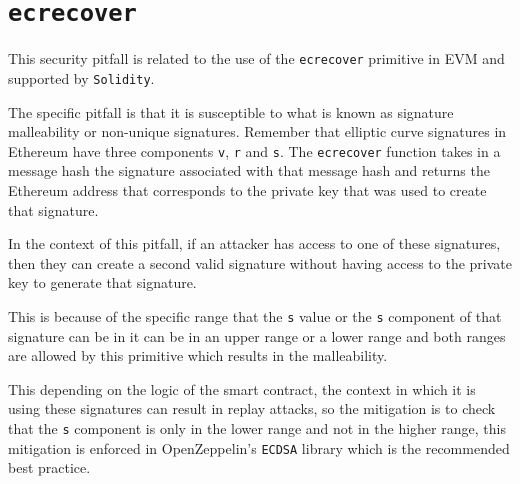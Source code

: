 \section{\texorpdfstring{\texttt{ecrecover}}{ecrecover}}\label{ecrecover}

This security pitfall is related to the use of the \texttt{ecrecover}
primitive in EVM and supported by \texttt{Solidity}.

The specific pitfall is that it is susceptible to what is known as
signature malleability or non-unique signatures. Remember that elliptic
curve signatures in Ethereum have three components \texttt{v},
\texttt{r} and \texttt{s}. The \texttt{ecrecover} function takes in a
message hash the signature associated with that message hash and returns
the Ethereum address that corresponds to the private key that was used
to create that signature.

In the context of this pitfall, if an attacker has access to one of
these signatures, then they can create a second valid signature without
having access to the private key to generate that signature.

This is because of the specific range that the \texttt{s} value or the
\texttt{s} component of that signature can be in it can be in an upper
range or a lower range and both ranges are allowed by this primitive
which results in the malleability.

This depending on the logic of the smart contract, the context in which
it is using these signatures can result in replay attacks, so the
mitigation is to check that the \texttt{s} component is only in the
lower range and not in the higher range, this mitigation is enforced in
OpenZeppelin's \texttt{ECDSA} library which is the recommended best
practice.
